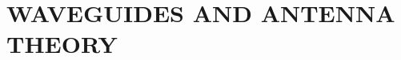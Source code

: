 \documentclass[a4paper,10pt, two column]{book}
\begin{document}
\part{WAVEGUIDES AND ANTENNA THEORY}


%
%
% 
% 
% 
% 
% 
% 


% 
% 
% 


% 
% 
% 
% 
% 
% 
% 
% 
% 
% 
% 
% 
% 
% 

\backmatter
\printindex

\shipoutAnswer
\end{document}
